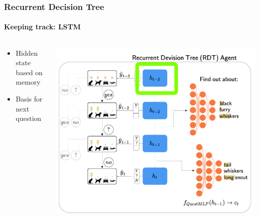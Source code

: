 \documentclass[9pt]{beamer}
\begin{document}
\begin{frame}
\frametitle{Recurrent Decision Tree}
\framesubtitle{Keeping track: LSTM}
\begin{columns}[T]
\begin{column}{.5\textwidth}
\begin{itemize}
	\item Hidden state based on memory
	\item Basis for next question
\end{itemize}
\end{column}
\begin{column}{.5\textwidth}
\includegraphics[width=\textwidth]{images/urdtc_parts_lstm.pdf}
\end{column}
\end{columns}
\end{frame}
\end{document}

